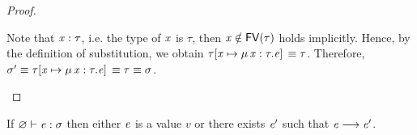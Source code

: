 \begin{proof}
\begin{description}
        Note that $\mathit{x}:\tau$, i.e. the type of $\mathit{x}$ is $\tau$, then
$\mathit{x} \notin \mathsf{FV}(\tau)$ holds implicitly. Hence, by the definition of
substitution, we obtain $\tau  [  \mathit{x}  \mapsto  \mu \, \mathit{x}  :  \tau  .  \mathit{e}  ] \,  \equiv  \tau$. Therefore, $\sigma'  \equiv  \tau  [  \mathit{x}  \mapsto  \mu \, \mathit{x}  :  \tau  .  \mathit{e}  ] \,  \equiv  \tau  \equiv  \sigma$.
    \end{description}
\end{proof}

\begin{thm}[Progress]
If $\varnothing  \vdash  \mathit{e}  :  \sigma$ then either $\mathit{e}$ is a value $v$ or there exists $\mathit{e}'$
such that $\mathit{e}  \longrightarrow  \mathit{e'}$.
\end{thm}

